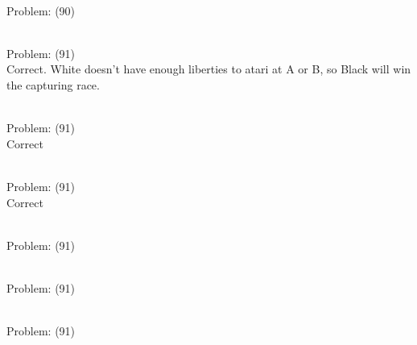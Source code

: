 \documentclass[11pt]{article}
\begin{document}
\begin{minipage}[t]{0.5\textwidth}
  {\centering
  
\\
Problem: (90)\\
  }
\end{minipage}
\begin{minipage}[t]{0.5\textwidth}
  {\centering
  
\\
Problem: (91)\\
Correct. White doesn't have enough liberties to atari at A or B, so Black will win the capturing race.\\
  }
\end{minipage}
\begin{minipage}[t]{0.5\textwidth}
  {\centering
  
\\
Problem: (91)\\
Correct\\
  }
\end{minipage}
\begin{minipage}[t]{0.5\textwidth}
  {\centering
  
\\
Problem: (91)\\
Correct\\
  }
\end{minipage}
\begin{minipage}[t]{0.5\textwidth}
  {\centering
  
\\
Problem: (91)\\
  }
\end{minipage}
\begin{minipage}[t]{0.5\textwidth}
  {\centering
  
\\
Problem: (91)\\
  }
\end{minipage}
\begin{minipage}[t]{0.5\textwidth}
  {\centering
  
\\
Problem: (91)\\
  }
\end{minipage}
\end{document}
